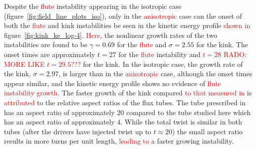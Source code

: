 \documentclass[12pt]{article}
\newcommand{\rs}[2]{\textcolor{red}{#2}}
\begin{document}
Despite the \rs{fluting}{flute} instability appearing in the isotropic
case (figure~\ref{fig:field_line_plots_iso}), only in the
\rs{switching}{anisotropic} case can the onset of both the
\rs{fluting}{flute} and kink instabilities be seen in the kinetic
energy profile \rs{}{shown in} figure~\ref{fig:kink_ke_log-4}. \rs{where}{Here,} the nonlinear
growth rates of the two instabilities are found to be $\gamma = 0.69$
for the \rs{fluting}{flute} and $\sigma = 2.55$ for the kink. The
onset times are approximately $t=27$ for the \rs{fluting}{flute}
instability and \rs{$t=28$}{$t=28$ RADO: MORE LIKE $t=29.5$???} for
the kink. In the isotropic case, the growth rate of the kink, $\sigma
= 2.97$, is larger than in the \rs{switching}{anisotropic} case,
although the onset times appear similar, and the kinetic energy
profile shows no evidence of \rs{the growth of the \rs{fluting}{flute}
instability.}{\rs{fluting}{flute} instability growth.} 
\rs{}{}
The faster growth of the kink compared \rs{to, say, that of
  chapter~}{to that measured in}
\cite{quinnEffectAnisotropicViscosity2020a} is \rs{due}{attributed} to
the relative aspect ratios of the flux tubes. The tube prescribed in
\rs{chapter~}{} \cite{quinnEffectAnisotropicViscosity2020a} has an aspect
ratio of approximately $20$ compared to the tube studied here which
has an aspect ratio of approximately $4$. While the total twist is
similar in both tubes (after the drivers have injected twist up to
$t\approx20$) the small aspect ratio results in more turns per unit
length, \rs{resulting in}{leading to} a faster growing instability. 
\end{document}

